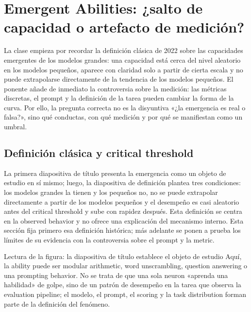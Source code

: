 \section{Emergent Abilities: ¿salto de capacidad o artefacto de medición?}

La clase empieza por recordar la definición clásica de 2022 sobre las capacidades emergentes de los modelos grandes: una capacidad está cerca del nivel aleatorio en los modelos pequeños, aparece con claridad solo a partir de cierta escala y no puede extrapolarse directamente de la tendencia de los modelos pequeños. El ponente añade de inmediato la controversia sobre la medición: las métricas discretas, el prompt y la definición de la tarea pueden cambiar la forma de la curva. Por ello, la pregunta correcta no es la disyuntiva «¿la emergencia es real o falsa?», sino qué conductas, con qué medición y por qué se manifiestan como un umbral.

\subsection{Definición clásica y critical threshold}

La primera diapositiva de título presenta la emergencia como un objeto de estudio en sí mismo; luego, la diapositiva de definición plantea tres condiciones: los modelos grandes la tienen y los pequeños no, no se puede extrapolar directamente a partir de los modelos pequeños y el desempeño es casi aleatorio antes del critical threshold y sube con rapidez después. Esta definición se centra en la observed behavior y no ofrece una explicación del mecanismo interno. Esta sección fija primero esa definición histórica; más adelante se ponen a prueba los límites de su evidencia con la controversia sobre el prompt y la metric.


\begin{knowledgebox}{Lectura de la figura: la diapositiva de título establece el objeto de estudio}
Aquí, la ability puede ser modular arithmetic, word unscrambling, question answering o una prompting behavior. No se trata de que una sola neuron «aprenda una habilidad» de golpe, sino de un patrón de desempeño en la tarea que observa la evaluation pipeline; el modelo, el prompt, el scoring y la task distribution forman parte de la definición del fenómeno.
\end{knowledgebox}


